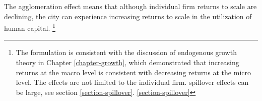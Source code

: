 The \gls{agglomeration effect} means that although individual firm returns to scale are declining, the city can experience \gls{increasing returns to scale} in the utilization of human capital. %
\footnote{The formulation is consistent with the discussion of endogenous growth theory in Chapter \ref{chapter-growth}, which demonstrated that increasing returns at the macro level is consistent with decreasing returns at the micro level. The effects are not limited to the individual firm. \Gls{spillover effects} can be large, see section \ref{section-spillover}. \ref{section-spillover}}